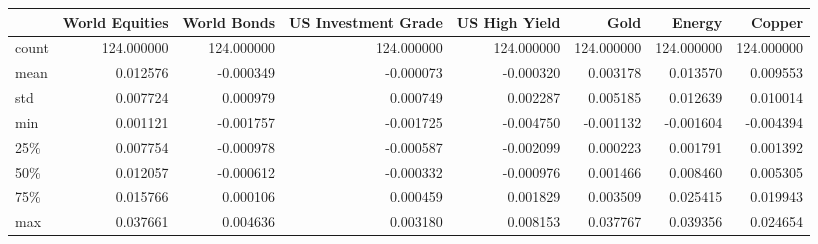 \begin{tabular}{lrrrrrrr}
\toprule
{} &  World Equities &  World Bonds &  US Investment Grade &  US High Yield &        Gold &      Energy &      Copper \\
\midrule
count &      124.000000 &   124.000000 &           124.000000 &     124.000000 &  124.000000 &  124.000000 &  124.000000 \\
mean  &        0.012576 &    -0.000349 &            -0.000073 &      -0.000320 &    0.003178 &    0.013570 &    0.009553 \\
std   &        0.007724 &     0.000979 &             0.000749 &       0.002287 &    0.005185 &    0.012639 &    0.010014 \\
min   &        0.001121 &    -0.001757 &            -0.001725 &      -0.004750 &   -0.001132 &   -0.001604 &   -0.004394 \\
25\%   &        0.007754 &    -0.000978 &            -0.000587 &      -0.002099 &    0.000223 &    0.001791 &    0.001392 \\
50\%   &        0.012057 &    -0.000612 &            -0.000332 &      -0.000976 &    0.001466 &    0.008460 &    0.005305 \\
75\%   &        0.015766 &     0.000106 &             0.000459 &       0.001829 &    0.003509 &    0.025415 &    0.019943 \\
max   &        0.037661 &     0.004636 &             0.003180 &       0.008153 &    0.037767 &    0.039356 &    0.024654 \\
\bottomrule
\end{tabular}
